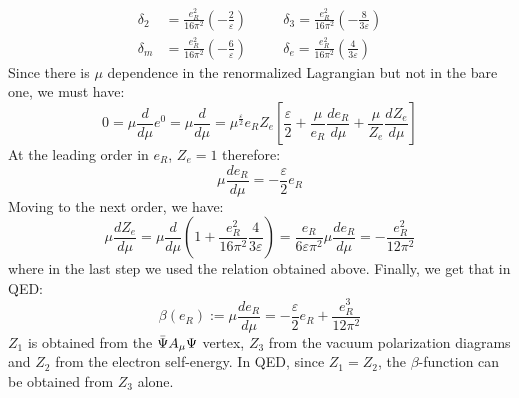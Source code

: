 \documentclass[../main.tex]{subfiles}
\begin{document}
\begin{example}
\begin{align*}
\delta_2&=\frac{e_R^2}{16\pi^2}\left(-\frac{2}{\varepsilon}\right) \quad &&\delta_3=\frac{e_R^2}{16\pi^2}\left(-\frac{8}{3\varepsilon}\right)\\
\delta_m&=\frac{e_R^2}{16\pi^2}\left(-\frac{6}{\varepsilon}\right) \quad &&\delta_e=\frac{e_R^2}{16\pi^2}\left(\frac{4}{3\varepsilon}\right)
\end{align*}
Since there is $\mu$ dependence in the renormalized Lagrangian but not in the bare one, we must have:
\[
0=\mu\frac{d}{d\mu}e^0=\mu\frac{d}{d\mu}=\mu^{\frac{\varepsilon}{2}}e_RZ_e\left[\frac{\varepsilon}{2}+\frac{\mu}{e_R}\frac{de_R}{d\mu}+\frac{\mu}{Z_e}\frac{dZ_e}{d\mu}\right]
\]
At the leading order in $e_R$, $Z_e=1$ therefore:
\[
\mu\frac{de_R}{d\mu}=-\frac{\varepsilon}{2}e_R
\]
Moving to the next order, we have:
\[
\mu\frac{dZ_e}{d\mu}=\mu\frac{d}{d\mu}\left(1+\frac{e_R^2}{16\pi^2}\frac{4}{3\varepsilon}\right)=\frac{e_R}{6\varepsilon\pi^2}\mu\frac{de_R}{d\mu}=-\frac{e_R^2}{12\pi^2}
\]
where in the last step we used the relation obtained above. Finally, we get that in QED:
\[
\beta(e_R):=\mu\frac{de_R}{d\mu}=-\frac{\varepsilon}{2}e_R+\frac{e_R^3}{12\pi^2}
\]
$Z_1$ is obtained from the $\Bar{\Psi}A_\mu\Psi$ vertex, $Z_3$ from the vacuum polarization diagrams and $Z_2$ from the electron self-energy. In QED, since $Z_1=Z_2$, the $\beta$-function can be obtained from $Z_3$ alone.
\end{example}
\end{document}
